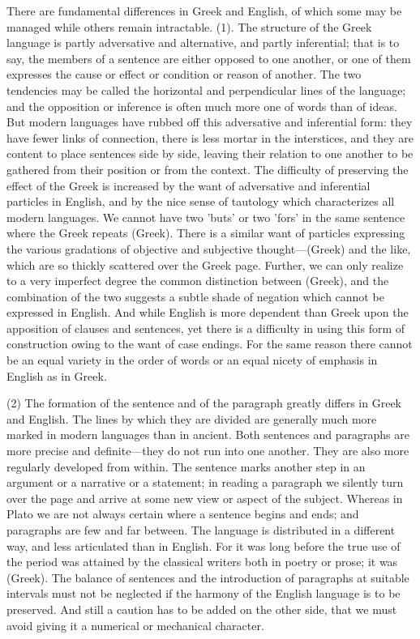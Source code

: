 \documentclass[11pt,letter]{article}
\begin{document}
\par  There are fundamental differences in Greek and English, of which some may be managed while others remain intractable. (1). The structure of the Greek language is partly adversative and alternative, and partly inferential; that is to say, the members of a sentence are either opposed to one another, or one of them expresses the cause or effect or condition or reason of another. The two tendencies may be called the horizontal and perpendicular lines of the language; and the opposition or inference is often much more one of words than of ideas. But modern languages have rubbed off this adversative and inferential form: they have fewer links of connection, there is less mortar in the interstices, and they are content to place sentences side by side, leaving their relation to one another to be gathered from their position or from the context. The difficulty of preserving the effect of the Greek is increased by the want of adversative and inferential particles in English, and by the nice sense of tautology which characterizes all modern languages. We cannot have two 'buts' or two 'fors' in the same sentence where the Greek repeats (Greek). There is a similar want of particles expressing the various gradations of objective and subjective thought—(Greek) and the like, which are so thickly scattered over the Greek page. Further, we can only realize to a very imperfect degree the common distinction between (Greek), and the combination of the two suggests a subtle shade of negation which cannot be expressed in English. And while English is more dependent than Greek upon the apposition of clauses and sentences, yet there is a difficulty in using this form of construction owing to the want of case endings. For the same reason there cannot be an equal variety in the order of words or an equal nicety of emphasis in English as in Greek.

\par  (2) The formation of the sentence and of the paragraph greatly differs in Greek and English. The lines by which they are divided are generally much more marked in modern languages than in ancient. Both sentences and paragraphs are more precise and definite—they do not run into one another. They are also more regularly developed from within. The sentence marks another step in an argument or a narrative or a statement; in reading a paragraph we silently turn over the page and arrive at some new view or aspect of the subject. Whereas in Plato we are not always certain where a sentence begins and ends; and paragraphs are few and far between. The language is distributed in a different way, and less articulated than in English. For it was long before the true use of the period was attained by the classical writers both in poetry or prose; it was (Greek). The balance of sentences and the introduction of paragraphs at suitable intervals must not be neglected if the harmony of the English language is to be preserved. And still a caution has to be added on the other side, that we must avoid giving it a numerical or mechanical character.
\end{document}
